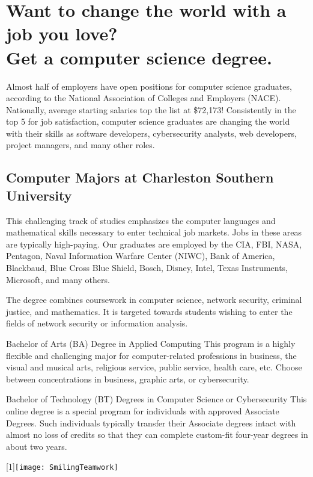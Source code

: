%
\section*{Want to change the world with a job you love?\\
Get a computer science degree.}
Almost half of employers have open positions for computer science graduates, according to the National Association of Colleges and Employers (NACE). Nationally, average starting salaries top the list at \$72,173! Consistently in the top 5 for job satisfaction, computer science graduates are changing the world with their skills as software developers, cybersecurity analysts, web developers, project managers, and many other roles.


\subsection{Computer Majors at Charleston Southern University}
\begin{description}

	\item[Bachelor of Science (BS) Degree in Computer Science] This challenging track of studies emphasizes the computer languages and mathematical skills necessary to enter technical job markets. Jobs in these areas are typically high-paying. Our graduates are employed by the CIA, FBI, NASA, Pentagon, Naval Information Warfare Center (NIWC), Bank of America, Blackbaud, Blue Cross Blue Shield, Bosch, Disney, Intel, Texas Instruments, Microsoft, and many others.
	\item[Bachelor of Science (BS) Degree in Cybersecurity] The degree combines coursework in computer science, network security, criminal justice, and mathematics. It is targeted towards students wishing to enter the fields of network security or information analysis.
	\begin{minipage}[][][t]{0.69\linewidth}
		\vspace{3pt}
		\item[Bachelor of Arts (BA) Degree in Applied Computing] This program is a highly flexible and challenging major for computer-related professions in business, the visual and musical arts, religious service, public service, health care, etc. Choose between concentrations in business, graphic arts, or cybersecurity.
		\item[Bachelor of Technology (BT) Degrees in Computer Science or Cybersecurity] This online degree is a special program for individuals with approved Associate Degrees. Such individuals typically transfer their Associate degrees intact with almost no loss of credits so that they can complete custom-fit four-year degrees in about two years.\vspace{0.5em}
	\end{minipage}
	\begin{minipage}[][][t]{0.3\linewidth}%
		\hfill
		\scalebox{-1}[1]{\texttt{[image: SmilingTeamwork]}}%
	\end{minipage}
\end{description}

